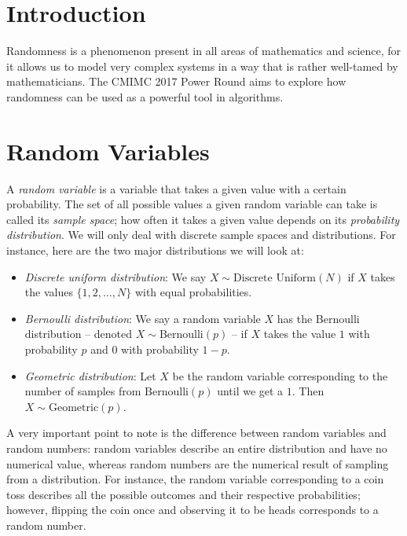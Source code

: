 \documentclass[12pt]{article}
\theoremstyle{plain}
\theoremstyle{definition}
\theoremstyle{remark}
\begin{document}
\newpage

\section{Introduction}

Randomness is a phenomenon present in all areas of mathematics and science, for it allows us to model very complex systems in a way that is rather well-tamed by mathematicians. The CMIMC 2017 Power Round aims to explore how randomness can be used as a powerful tool in algorithms.

\section{Random Variables}

A \emph{random variable} is a variable that takes a given value with a certain probability. The set of all possible values a given random variable can take is called its \emph{sample space}; how often it takes a given value depends on its \emph{probability distribution}. We will only deal with discrete sample spaces and distributions. For instance, here are the two major distributions we will look at:

\begin{itemize}
\item \emph{Discrete uniform distribution}: We say $X\sim\text{Discrete Uniform}(N)$ if $X$ takes the values $\{1,2,\dots,N\}$ with equal probabilities.

\item \emph{Bernoulli distribution}: We say a random variable $X$ has the Bernoulli distribution -- denoted $X\sim\text{Bernoulli}(p)$ -- if $X$ takes the value $1$ with probability $p$ and $0$ with probability $1-p$.

\item \emph{Geometric distribution}: Let $X$ be the random variable corresponding to the number of samples from $\text{Bernoulli}(p)$ until we get a $1$. Then $X\sim\text{Geometric}(p)$.
\end{itemize}

A very important point to note is the difference between random variables and random numbers: random variables describe an entire distribution and have no numerical value, whereas random numbers are the numerical result of sampling from a distribution. For instance, the random variable corresponding to a coin toss describes all the possible outcomes and their respective probabilities; however, flipping the coin once and observing it to be heads corresponds to a random number.
\end{document}
